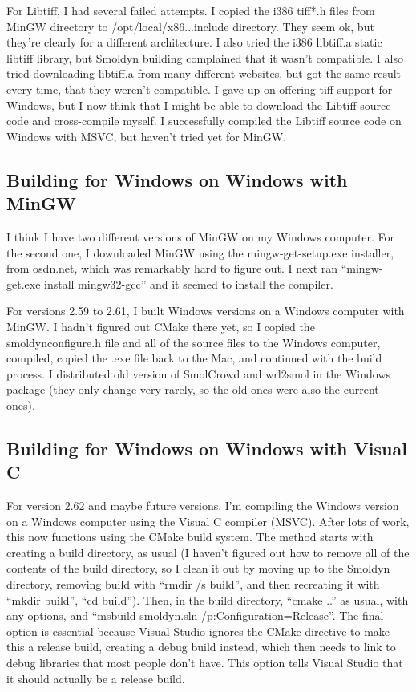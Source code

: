 \documentclass {scrbook}
\begin{document}
For Libtiff, I had several failed attempts. I copied the i386 tiff*.h files from MinGW directory to /opt/local/x86...include directory. They seem ok, but they're clearly for a different architecture. I also tried the i386 libtiff.a static libtiff library, but Smoldyn building complained that it wasn't compatible. I also tried downloading libtiff.a from many different websites, but got the same result every time, that they weren't compatible. I gave up on offering tiff support for Windows, but I now think that I might be able to download the Libtiff source code and cross-compile myself. I successfully compiled the Libtiff source code on Windows with MSVC, but haven't tried yet for MinGW.


\subsection{Building for Windows on Windows with MinGW}

I think I have two different versions of MinGW on my Windows computer. For the second one, I downloaded MinGW using the mingw-get-setup.exe installer, from osdn.net, which was remarkably hard to figure out. I next ran ``mingw-get.exe install mingw32-gcc'' and it seemed to install the compiler.

For versions 2.59 to 2.61, I built Windows versions on a Windows computer with MinGW. I hadn't figured out CMake there yet, so I copied the smoldynconfigure.h file and all of the source files to the Windows computer, compiled, copied the .exe file back to the Mac, and continued with the build process. I distributed old version of SmolCrowd and wrl2smol in the Windows package (they only change very rarely, so the old ones were also the current ones).


\subsection{Building for Windows on Windows with Visual C}

For version 2.62 and maybe future versions, I'm compiling the Windows version on a Windows computer using the Visual C compiler (MSVC). After lots of work, this now functions using the CMake build system. The method starts with creating a build directory, as usual (I haven't figured out how to remove all of the contents of the build directory, so I clean it out by moving up to the Smoldyn directory, removing build with ``rmdir /s build'', and then recreating it with ``mkdir build'', ``cd build''). Then, in the build directory, ``cmake ..'' as usual, with any options, and ``msbuild smoldyn.sln /p:Configuration=Release''. The final option is essential because Visual Studio ignores the CMake directive to make this a release build, creating a debug build instead, which then needs to link to debug libraries that most people don't have. This option tells Visual Studio that it should actually be a release build.
\end{document}
